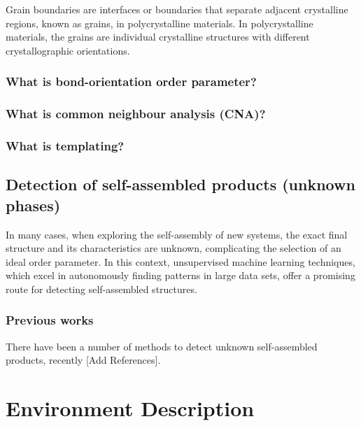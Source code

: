 \documentclass{report}
\begin{document}
Grain boundaries are interfaces or boundaries that separate adjacent crystalline regions, known as grains, in polycrystalline materials. In polycrystalline materials, the grains are individual crystalline structures with different crystallographic orientations.

\subsection{What is bond-orientation order parameter?}
\subsection{What is common neighbour analysis (CNA)?}
\subsection{What is templating?}

\section{Detection of self-assembled products (unknown phases)}

In many cases, when exploring the self-assembly of new systems, the exact final structure and its characteristics are unknown, complicating the selection of an ideal order parameter. In this context, unsupervised machine learning techniques, which excel in autonomously finding patterns in large data sets, offer a promising route for detecting self-assembled structures.

\subsection{Previous works}

There have been a number of methods to detect unknown self-assembled products, recently [Add References].


\chapter{Environment Description}
\end{document}
